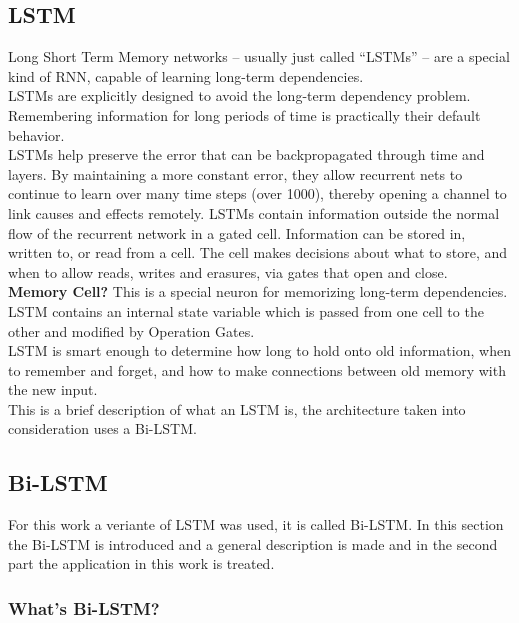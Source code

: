 \documentclass[twocolumn,10pt]{wmrDoc}
\begin{document}
\subsection{LSTM}
Long Short Term Memory networks – usually just called \cite{hochreiter1997long}“LSTMs” – are a special kind of RNN, capable of learning long-term dependencies.\\
LSTMs are explicitly designed to avoid the long-term dependency problem. Remembering information for long periods of time is practically their default behavior.\\
LSTMs help preserve the error that can be backpropagated through time and layers. By maintaining a more constant error, they allow recurrent nets to continue to learn over many time steps (over 1000), thereby opening a channel to link causes and effects remotely.
LSTMs contain information outside the normal flow of the recurrent network in a gated cell. Information can be stored in, written to, or read from a cell. The cell makes decisions about what to store, and when to allow reads, writes and erasures, via gates that open and close.\\
\textbf{Memory Cell?} This is a special neuron for memorizing long-term dependencies. LSTM contains an internal state variable which is passed from one cell to the other and modified by Operation Gates.\\
LSTM is smart enough to determine how long to hold onto old information, when to remember and forget, and how to make connections between old memory with the new input. \\
This is a brief description of what an LSTM is, the architecture taken into consideration uses a Bi-LSTM.\\

\subsection{Bi-LSTM}
For this work a veriante of LSTM was used, it is called Bi-LSTM.
In this section the Bi-LSTM is introduced and a general description is made and in the second part 
the application in this work is treated.\\

\subsubsection{What's Bi-LSTM?}
\end{document}
